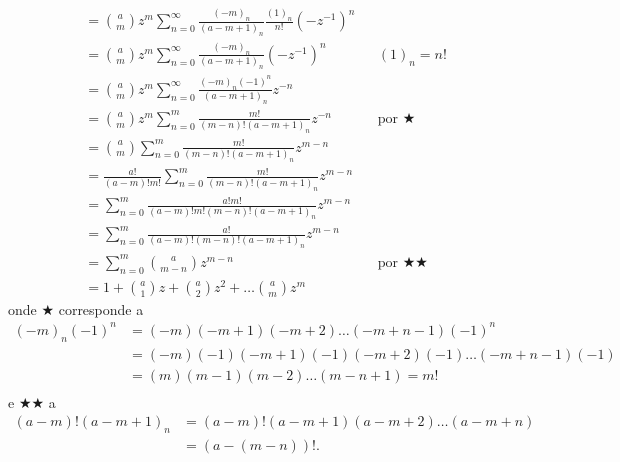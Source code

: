 \documentclass[a4paper,12pt, leqno, answers]{exam}
\begin{document}
\begin{questions}
\begin{parts}
\begin{solution}
\begin{align*}
                &= \binom{a}{m} z^m \sum_{n = 0}^\infty \frac{(-m)_n}{(a - m + 1)_n} \frac{(1)_n}{n!} (-z^{-1})^n \\
                &= \binom{a}{m} z^m \sum_{n = 0}^\infty \frac{(-m)_n}{(a - m + 1)_n} (-z^{-1})^n && (1)_n = n! \\
                &= \binom{a}{m} z^m \sum_{n = 0}^\infty \frac{(-m)_n (-1)^{n}}{(a - m + 1)_n} z^{-n} \\
                &= \binom{a}{m} z^m \sum_{n = 0}^m \frac{m!}{(m - n)! (a - m + 1)_n} z^{-n} && \text{por $\bigstar$} \\
                &= \binom{a}{m} \sum_{n = 0}^m \frac{m!}{(m - n)! (a - m + 1)_n} z^{m - n} \\
                &= \frac{a!}{(a - m)! m!} \sum_{n = 0}^m \frac{m!}{(m - n)! (a - m + 1)_n} z^{m - n} \\
                &= \sum_{n = 0}^m \frac{a! m!}{(a - m)! m! (m - n)! (a - m + 1)_n} z^{m - n} \\
                &= \sum_{n = 0}^m \frac{a!}{(a - m)! (m - n)! (a - m + 1)_n} z^{m - n} \\
                &= \sum_{n = 0}^m \binom{a}{m - n} z^{m - n} && \text{por $\bigstar\bigstar$} \\
                &= 1 + \binom{a}{1} z + \binom{a}{2} z^2 + \ldots \binom{a}{m} z^m
            \end{align*}
            onde $\bigstar$ corresponde a
            \begin{align*}
                (-m)_n (-1)^n &= (-m) (-m + 1) (-m + 2) \ldots (-m + n - 1) (-1)^n \\
                &= (-m) (-1) (-m + 1) (-1) (-m + 2) (-1) \ldots (-m + n - 1) (-1) \\
                &= (m) (m - 1) (m - 2) \ldots (m - n + 1) = m! \\
            \end{align*}
            e $\bigstar\bigstar$ a
            \begin{align*}
                (a - m)! (a - m + 1)_n &= (a - m)! (a - m + 1) (a - m + 2) \ldots (a - m + n) \\
                &= (a - (m - n))!.
            \end{align*}
        \end{solution}


\end{parts}
\end{questions}
\end{document}
